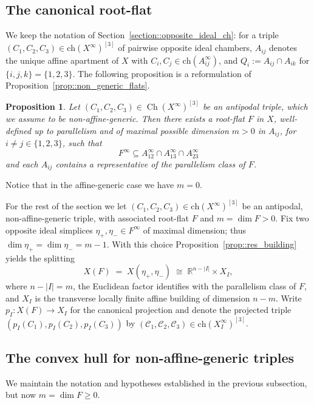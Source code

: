 \documentclass[11pt]{amsart}
\newcommand{\bbR}{\mathbb{R}}
\newcommand{\Ch}{\mathrm{ch}}
\theoremstyle{plain}
\newtheorem{prop}[thm]{Proposition}
\theoremstyle{definition}
\theoremstyle{remark}
\begin{document}
	
	
	\subsection{The canonical root-flat}
	
	We keep the notation of Section~\ref{section::opposite_ideal_ch}: for a triple $(C_1,C_2,C_3)\in\Ch(X^\infty)^{[3]}$ of pairwise opposite ideal chambers, $A_{ij}$ denotes the unique affine apartment of $X$ with $C_i,C_j\in \Ch(A_{ij}^\infty)$, and $Q_i:=A_{ij}\cap A_{ik}$ for $\{i,j,k\}=\{1,2,3\}$.
	The following proposition is a reformulation of Proposition~\ref{prop::non_generic_flats}. 
		
	\begin{prop}\label{prop:root-flat_triple}
    Let $(C_1,C_2,C_3)\in\operatorname{Ch}(X^\infty)^{[3]}$ be an antipodal triple, which we assume to be non-affine-generic. Then there exists a root-flat $F$ in $X$, well-defined up to parallelism and of maximal possible dimension $m >0$ in $A_{ij}$, for $i\neq j \in \{1,2,3\}$, such that
    \[
    F^\infty \subseteq A_{12}^\infty \cap A_{13}^\infty \cap A_{23}^\infty
    \]
    and each $A_{ij}$ contains a representative of the parallelism class of $F$. 
\end{prop}

	Notice that in the affine-generic case we have $m=0$.
	
\medskip	
	For the rest of the section we let $(C_1,C_2,C_3)\in\Ch(X^\infty)^{[3]}$ be an antipodal, non-affine-generic triple, with associated root-flat $F$ and $m=\dim F > 0$. Fix two opposite ideal simplices $\eta_+,\eta_-\in F^\infty$ of maximal dimension; thus $\dim\eta_+=\dim\eta_-=m-1$. With this choice Proposition~\ref{prop::res_building} yields the splitting
	\[
	X(F) \;=\; X(\eta_+,\eta_-) \;\cong\; \bbR^{n-|I|}\times X_I,
	\]
	where $n-|I|=m$, the Euclidean factor identifies with the parallelism class of $F$, and $X_I$ is the transverse locally finite affine building of dimension $n-m$. Write $p_I:X(F)\to X_I$ for the canonical projection and denote the projected triple $(p_I(C_1), p_I(C_2),p_I(C_3))$ by $(\mathcal C_1,\mathcal C_2,\mathcal C_3)\in\Ch(X_I^\infty)^{[3]}$.
	
	\subsection{The convex hull for non-affine-generic triples}
	We maintain the notation and hypotheses established in the previous subsection, but now $m=\dim F \ge 0$.
		
\end{document}
